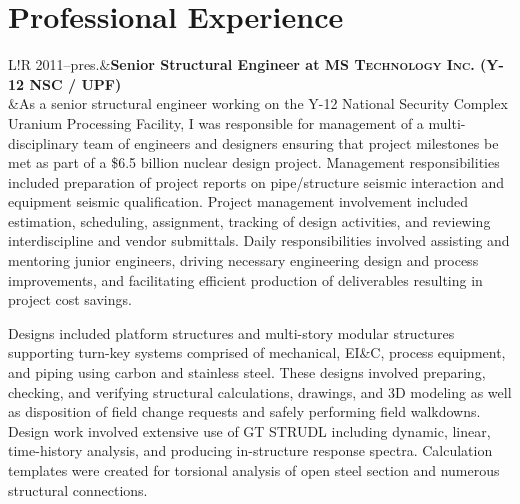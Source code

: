 \documentclass[11pt,letterpaper]{article}
\newcommand\VRule{\color{lightgray}\vrule width 0.5pt}
\begin{document}
\section*{Professional Experience}
\begin{tabular}{L!{\VRule}R}
2011--pres.&{\bf Senior Structural Engineer at \fontsize{12}{12}\textsc{MS Technology Inc. (Y-12 NSC / UPF)}}\\
&As a senior structural engineer working on the Y-12 National Security Complex Uranium Processing Facility, I was responsible for management of a multi-disciplinary team of engineers and designers ensuring that project milestones be met as part of a \$6.5 billion nuclear design project.  Management responsibilities included preparation of project reports on pipe/structure seismic interaction and equipment seismic qualification.  Project management involvement included estimation, scheduling, assignment, tracking of design activities, and reviewing interdiscipline and vendor submittals.  Daily responsibilities involved assisting and mentoring junior engineers, driving necessary engineering design and process improvements, and facilitating efficient production of deliverables resulting in project cost savings.  
\vspace{0.6em}
\par
Designs included platform structures and multi-story modular structures supporting turn-key systems comprised of mechanical, EI\&C, process equipment, and piping using carbon and stainless steel.  These designs involved preparing, checking, and verifying structural calculations, drawings, and 3D modeling as well as disposition of field change requests and safely performing field walkdowns.  Design work involved extensive use of GT STRUDL including dynamic, linear, time-history analysis, and producing in-structure response spectra.  Calculation templates were created for torsional analysis of open steel section and numerous structural connections.
\end{tabular}
\end{document}
